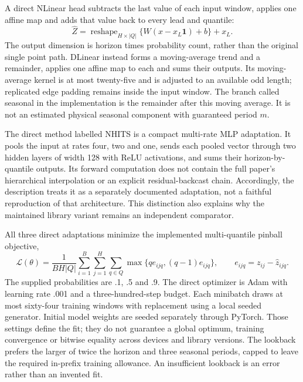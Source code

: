 A direct NLinear head subtracts the last value of each input window, applies one affine map and adds that value back to every lead and quantile:
\begin{equation}\label{eq:report-nlinear}
\widehat Z=\operatorname{reshape}_{H\times |Q|}\{W(x-x_L\mathbf1)+b\}+x_L.
\end{equation}
The output dimension is horizon times probability count, rather than the original single point path. DLinear instead forms a moving-average trend and a remainder, applies one affine map to each and sums their outputs. Its moving-average kernel is at most twenty-five and is adjusted to an available odd length; replicated edge padding remains inside the input window. The branch called seasonal in the implementation is the remainder after this moving average. It is not an estimated physical seasonal component with guaranteed period $m$.

The direct method labelled NHITS is a compact multi-rate MLP adaptation. It pools the input at rates four, two and one, sends each pooled vector through two hidden layers of width 128 with ReLU activations, and sums their horizon-by-quantile outputs. Its forward computation does not contain the full paper's hierarchical interpolation or an explicit residual-backcast chain. Accordingly, the description treats it as a separately documented adaptation, not a faithful reproduction of that architecture. This distinction also explains why the maintained library variant remains an independent comparator.

All three direct adaptations minimize the implemented multi-quantile pinball objective,
\begin{equation}\label{eq:report-neural-pinball}
\mathcal L(\theta)=\frac{1}{B H |Q|}\sum_{i=1}^{B}\sum_{j=1}^{H}\sum_{q\in Q}
\max\{q e_{ijq},(q-1)e_{ijq}\},\qquad e_{ijq}=z_{ij}-\widehat z_{ijq}.
\end{equation}
The supplied probabilities are .1, .5 and .9. The direct optimizer is Adam with learning rate .001 and a three-hundred-step budget. Each minibatch draws at most sixty-four training windows with replacement using a local seeded generator. Initial model weights are seeded separately through PyTorch. Those settings define the fit; they do not guarantee a global optimum, training convergence or bitwise equality across devices and library versions. The lookback prefers the larger of twice the horizon and three seasonal periods, capped to leave the required in-prefix training allowance. An insufficient lookback is an error rather than an invented fit.

